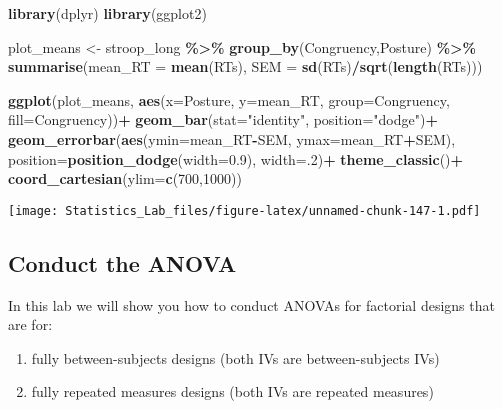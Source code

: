 \documentclass[
]{book}
\newenvironment{Shaded}{\begin{snugshade}}{\end{snugshade}}
\newcommand{\AttributeTok}[1]{\textcolor[rgb]{0.13,0.29,0.53}{#1}}
\newcommand{\DecValTok}[1]{\textcolor[rgb]{0.00,0.00,0.81}{#1}}
\newcommand{\FloatTok}[1]{\textcolor[rgb]{0.00,0.00,0.81}{#1}}
\newcommand{\FunctionTok}[1]{\textcolor[rgb]{0.13,0.29,0.53}{\textbf{#1}}}
\newcommand{\NormalTok}[1]{#1}
\newcommand{\OtherTok}[1]{\textcolor[rgb]{0.56,0.35,0.01}{#1}}
\newcommand{\SpecialCharTok}[1]{\textcolor[rgb]{0.81,0.36,0.00}{\textbf{#1}}}
\newcommand{\StringTok}[1]{\textcolor[rgb]{0.31,0.60,0.02}{#1}}
\providecommand{\tightlist}{%
  \setlength{\itemsep}{0pt}\setlength{\parskip}{0pt}}
\begin{document}
\begin{Shaded}
\begin{Highlighting}[]
\FunctionTok{library}\NormalTok{(dplyr)}
\FunctionTok{library}\NormalTok{(ggplot2)}

\NormalTok{plot\_means }\OtherTok{\textless{}{-}}\NormalTok{ stroop\_long }\SpecialCharTok{\%\textgreater{}\%}
            \FunctionTok{group\_by}\NormalTok{(Congruency,Posture) }\SpecialCharTok{\%\textgreater{}\%}
            \FunctionTok{summarise}\NormalTok{(}\AttributeTok{mean\_RT =} \FunctionTok{mean}\NormalTok{(RTs),}
                      \AttributeTok{SEM =} \FunctionTok{sd}\NormalTok{(RTs)}\SpecialCharTok{/}\FunctionTok{sqrt}\NormalTok{(}\FunctionTok{length}\NormalTok{(RTs)))}

\FunctionTok{ggplot}\NormalTok{(plot\_means, }\FunctionTok{aes}\NormalTok{(}\AttributeTok{x=}\NormalTok{Posture, }\AttributeTok{y=}\NormalTok{mean\_RT, }\AttributeTok{group=}\NormalTok{Congruency, }\AttributeTok{fill=}\NormalTok{Congruency))}\SpecialCharTok{+}
  \FunctionTok{geom\_bar}\NormalTok{(}\AttributeTok{stat=}\StringTok{"identity"}\NormalTok{, }\AttributeTok{position=}\StringTok{"dodge"}\NormalTok{)}\SpecialCharTok{+}
  \FunctionTok{geom\_errorbar}\NormalTok{(}\FunctionTok{aes}\NormalTok{(}\AttributeTok{ymin=}\NormalTok{mean\_RT}\SpecialCharTok{{-}}\NormalTok{SEM, }\AttributeTok{ymax=}\NormalTok{mean\_RT}\SpecialCharTok{+}\NormalTok{SEM), }
                \AttributeTok{position=}\FunctionTok{position\_dodge}\NormalTok{(}\AttributeTok{width=}\FloatTok{0.9}\NormalTok{),}
                \AttributeTok{width=}\NormalTok{.}\DecValTok{2}\NormalTok{)}\SpecialCharTok{+}
  \FunctionTok{theme\_classic}\NormalTok{()}\SpecialCharTok{+}
  \FunctionTok{coord\_cartesian}\NormalTok{(}\AttributeTok{ylim=}\FunctionTok{c}\NormalTok{(}\DecValTok{700}\NormalTok{,}\DecValTok{1000}\NormalTok{))}
\end{Highlighting}
\end{Shaded}

\texttt{[image: Statistics\_Lab\_files/figure-latex/unnamed-chunk-147-1.pdf]}

\hypertarget{conduct-the-anova-1}{%
\subsection{Conduct the ANOVA}\label{conduct-the-anova-1}}

In this lab we will show you how to conduct ANOVAs for factorial designs
that are for:

\begin{enumerate}
\def\labelenumi{\arabic{enumi}.}
\tightlist
\item
  fully between-subjects designs (both IVs are between-subjects IVs)
\item
  fully repeated measures designs (both IVs are repeated measures)
\end{enumerate}
\end{document}

